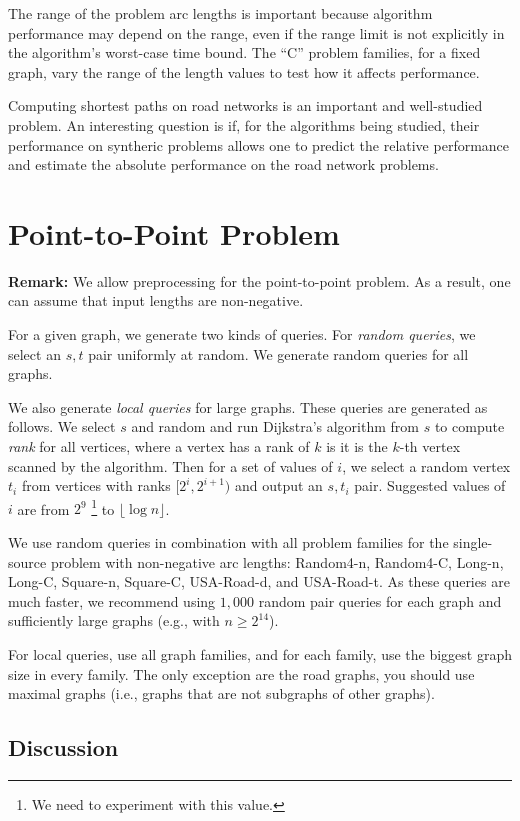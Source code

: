 \documentclass[11pt]{article}
\begin{document}
The range of the problem arc lengths is important because algorithm
performance may depend on the range, even if the range limit is
not explicitly in the algorithm's worst-case time bound.
The ``C'' problem families, for a fixed
graph, vary the range of the length values to test how it affects
performance.

Computing shortest paths on road networks is an important and well-studied
problem.
An interesting question is if, for the algorithms being studied,
their performance on syntheric problems allows one to predict the
relative performance and estimate the absolute performance on the road network
problems.


\section{Point-to-Point Problem}

{\bf Remark:} We allow preprocessing for the point-to-point problem.
As a result, one can assume that input lengths are non-negative.

For a given graph, we generate two kinds of queries. For {\em
random queries}, we select an $s,t$ pair uniformly at random. We
generate random queries for all graphs.

We also generate {\em local queries} for large graphs.
These queries are generated as follows.
We select $s$ and random and run Dijkstra's algorithm from $s$ to
compute {\em rank} for all vertices,
where a vertex has a rank of $k$ is it is the $k$-th vertex scanned
by the algorithm.
Then for a set of values of $i$, we select a random vertex
$t_i$ from vertices with ranks $[2^i, 2^{i+1})$ and output
an $s, t_i$ pair.
Suggested values of $i$ are from $2^{9}$ \footnote{We need to experiment with this value.}
to $\lfloor \log n \rfloor$.

We use random queries in combination with all problem families
for the single-source problem with non-negative arc lengths:
Random4-n, Random4-C, Long-n, Long-C, Square-n, Square-C,
USA-Road-d, and USA-Road-t.
As these queries are much faster, we recommend using $1,000$
random pair queries for each graph and sufficiently large graphs (e.g., with $n\ge 2^{14}$).

For local queries, use all graph families, and for each family,
use the biggest graph size in every family.
The only exception are the road graphs, you should use maximal
graphs (i.e., graphs that are not subgraphs of other graphs).

\subsection{Discussion}
\end{document}
